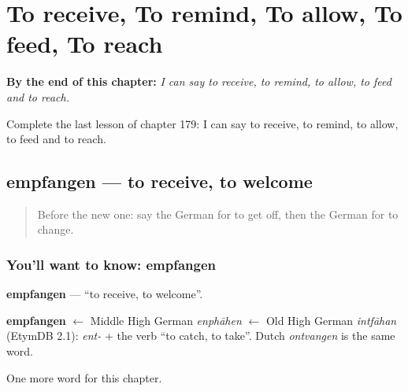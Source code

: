 
\chapter{To receive, To remind, To allow, To feed, To reach}
\label{ch:ge-to-receive-to-remind-to-allow-to-feed-to-reach}

\begin{chapteropening}
\textbf{By the end of this chapter:} \emph{I can say to receive, to remind, to allow, to feed and to reach.}

Complete the last lesson of chapter 179: I can say to receive, to remind, to allow, to feed and to reach.
\end{chapteropening}

\section[empfangen]{empfangen — to receive, to welcome}

\label{lesson:GE-C179-empfangen}



\begin{quote}
Before the new one: say the German for to get off, then the German for to change.
\end{quote}

\subsection*{You'll want to know: empfangen}
\textbf{empfangen} — \textquotedblleft{}to receive, to welcome\textquotedblright{}.

\begin{cousinweb}
\textbf{empfangen} $\leftarrow$ Middle High German \emph{enphāhen} $\leftarrow$ Old High German \emph{intfāhan} (EtymDB 2.1): \emph{ent-} + the verb \textquotedblleft{}to catch, to take\textquotedblright{}. Dutch \emph{ontvangen} is the same word.
\end{cousinweb}

\begin{grammarlens}[title={What you've built}]
One more word for this chapter.
\end{grammarlens}

